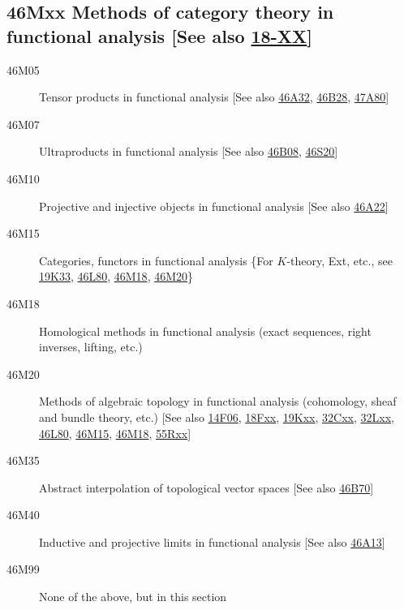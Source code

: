 \documentclass[letterpaper]{article}
\begin{document}
\subsection*{46Mxx  Methods of category theory in functional analysis [See also \hyperref[18-XX]{18-XX}] }\label{46Mxx}
\begin{description} 
\item [46M05]\label{46M05} Tensor products in functional analysis [See also \hyperref[46A32]{46A32}, \hyperref[46B28]{46B28}, \hyperref[47A80]{47A80}]
\item [46M07]\label{46M07} Ultraproducts in functional analysis [See also \hyperref[46B08]{46B08}, \hyperref[46S20]{46S20}]
\item [46M10]\label{46M10} Projective and injective objects in functional analysis [See also \hyperref[46A22]{46A22}]
\item [46M15]\label{46M15} Categories, functors  in functional analysis \{For $K$-theory, Ext, etc., see \hyperref[19K33]{19K33}, \hyperref[46L80]{46L80}, \hyperref[46M18]{46M18}, \hyperref[46M20]{46M20}\}
\item [46M18]\label{46M18} Homological methods in functional analysis (exact sequences, right inverses, lifting, etc.)
\item [46M20]\label{46M20} Methods of algebraic topology in functional analysis (cohomology, sheaf and bundle theory, etc.) [See also \hyperref[14F06]{14F06}, \hyperref[18Fxx]{18Fxx}, \hyperref[19Kxx]{19Kxx}, \hyperref[32Cxx]{32Cxx}, \hyperref[32Lxx]{32Lxx}, \hyperref[46L80]{46L80}, \hyperref[46M15]{46M15}, \hyperref[46M18]{46M18}, \hyperref[55Rxx]{55Rxx}]
\item [46M35]\label{46M35} Abstract interpolation of topological vector spaces [See also \hyperref[46B70]{46B70}]
\item [46M40]\label{46M40} Inductive and projective limits in functional analysis [See also \hyperref[46A13]{46A13}]
\item [46M99]\label{46M99} None of the above, but in this section
\end{description}
\end{document}
